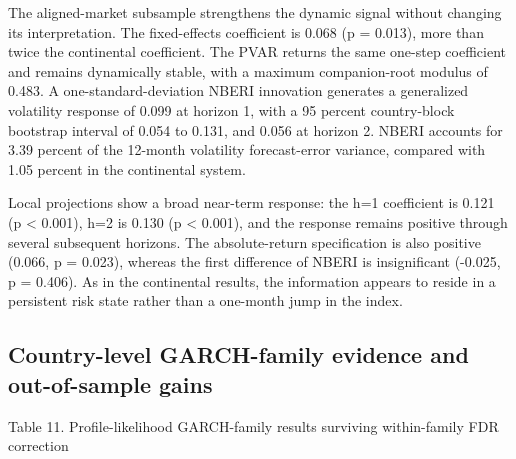 \documentclass[11pt]{article}
\begin{document}
The aligned-market subsample strengthens the dynamic signal without
changing its interpretation. The fixed-effects coefficient is 0.068 (p =
0.013), more than twice the continental coefficient. The PVAR returns
the same one-step coefficient and remains dynamically stable, with a
maximum companion-root modulus of 0.483. A one-standard-deviation NBERI
innovation generates a generalized volatility response of 0.099 at
horizon 1, with a 95 percent country-block bootstrap interval of 0.054
to 0.131, and 0.056 at horizon 2. NBERI accounts for 3.39 percent of the
12-month volatility forecast-error variance, compared with 1.05 percent
in the continental system.

Local projections show a broad near-term response: the h=1 coefficient
is 0.121 (p \textless{} 0.001), h=2 is 0.130 (p \textless{} 0.001), and
the response remains positive through several subsequent horizons. The
absolute-return specification is also positive (0.066, p = 0.023),
whereas the first difference of NBERI is insignificant (-0.025, p =
0.406). As in the continental results, the information appears to reside
in a persistent risk state rather than a one-month jump in the index.

\subsection{Country-level GARCH-family evidence and out-of-sample
gains}\label{country-level-garch-family-evidence-and-out-of-sample-gains}

Table 11. Profile-likelihood GARCH-family results surviving
within-family FDR correction
\end{document}
